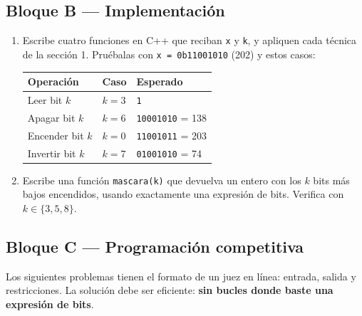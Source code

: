 \documentclass[12pt, oneside]{article}
\begin{document}
\subsection{Bloque B — Implementación}

\begin{enumerate}[resume]

  \item Escribe cuatro funciones en C++ que reciban \texttt{x} y \texttt{k},
        y apliquen cada técnica de la sección 1. Pruébalas con
        \texttt{x = 0b11001010} (202) y estos casos:

        \begin{center}
        \begin{tabular}{lll}
          \toprule
          \textbf{Operación} & \textbf{Caso} & \textbf{Esperado} \\
          \midrule
          Leer bit $k$      & $k=3$ & \texttt{1} \\
          Apagar bit $k$    & $k=6$ & \texttt{10001010} = 138 \\
          Encender bit $k$  & $k=0$ & \texttt{11001011} = 203 \\
          Invertir bit $k$  & $k=7$ & \texttt{01001010} = 74 \\
          \bottomrule
        \end{tabular}
        \end{center}

  \item Escribe una función \texttt{mascara(k)} que devuelva un entero con
        los $k$ bits más bajos encendidos, usando exactamente una expresión
        de bits. Verifica con $k \in \{3, 5, 8\}$.

\end{enumerate}

\subsection{Bloque C — Programación competitiva}

Los siguientes problemas tienen el formato de un juez en línea:
entrada, salida y restricciones. La solución debe ser eficiente:
\textbf{sin bucles donde baste una expresión de bits}.
\end{document}
